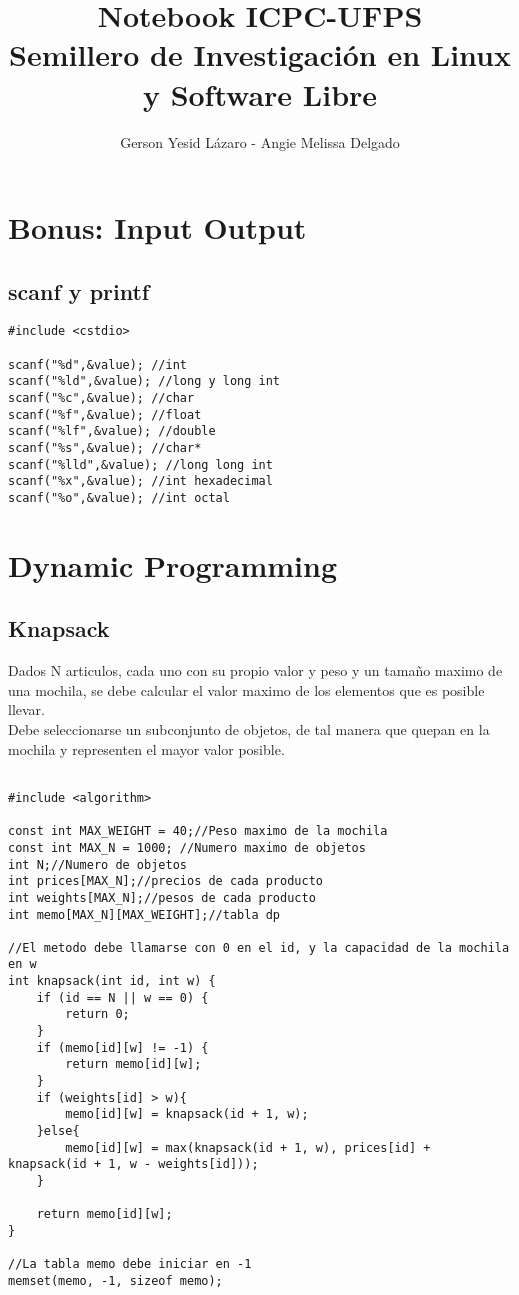 \documentclass[11pt,letterpaper,twocolumn,twosided]{article}
\begin{document}
\title{Notebook ICPC-UFPS\\Semillero de Investigaci\'on en Linux y Software Libre}
\author{Gerson Yesid L\'azaro - Angie Melissa Delgado}
\maketitle
\tableofcontents
{}


\section{Bonus: Input Output}

\subsection{scanf y printf}
\begin{lstlisting}
#include <cstdio>

scanf("%d",&value); //int
scanf("%ld",&value); //long y long int
scanf("%c",&value); //char 
scanf("%f",&value); //float
scanf("%lf",&value); //double
scanf("%s",&value); //char*
scanf("%lld",&value); //long long int
scanf("%x",&value); //int hexadecimal
scanf("%o",&value); //int octal
\end{lstlisting}

\section{Dynamic Programming}

\subsection{Knapsack}
Dados N articulos, cada uno con su propio valor y peso y un tamaño maximo de una mochila, se debe calcular el valor maximo de los elementos que es posible llevar.\\
Debe seleccionarse un subconjunto de objetos, de tal manera que quepan en la mochila y representen el mayor valor posible.

\begin{lstlisting}

#include <algorithm>

const int MAX_WEIGHT = 40;//Peso maximo de la mochila
const int MAX_N = 1000; //Numero maximo de objetos
int N;//Numero de objetos 
int prices[MAX_N];//precios de cada producto
int weights[MAX_N];//pesos de cada producto
int memo[MAX_N][MAX_WEIGHT];//tabla dp

//El metodo debe llamarse con 0 en el id, y la capacidad de la mochila en w
int knapsack(int id, int w) {
  	if (id == N || w == 0) {
  		return 0;
  	}
  	if (memo[id][w] != -1) {
  		return memo[id][w];
  	}
  	if (weights[id] > w){
  		memo[id][w] = knapsack(id + 1, w);
  	}else{
  		memo[id][w] = max(knapsack(id + 1, w), prices[id] + knapsack(id + 1, w - weights[id]));
  	}
  	
  	return memo[id][w];
}

//La tabla memo debe iniciar en -1
memset(memo, -1, sizeof memo);
\end{lstlisting}
\end{document}
